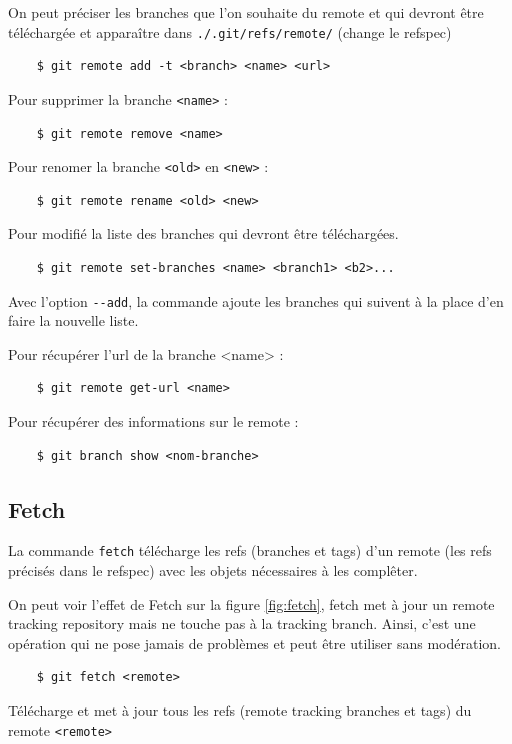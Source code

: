 \documentclass[a4paper, 12pt]{article}
\begin{document}
    On peut préciser les branches que l'on souhaite du remote et qui devront
    être téléchargée et apparaître dans \lstinline{./.git/refs/remote/} (change
    le refspec) 
    \begin{lstlisting}
    $ git remote add -t <branch> <name> <url>
    \end{lstlisting}

    Pour supprimer la branche \lstinline{<name>} :
    \begin{lstlisting}
    $ git remote remove <name>
    \end{lstlisting}

    Pour renomer la branche \lstinline{<old>} en \lstinline{<new>} :
    \begin{lstlisting}
    $ git remote rename <old> <new>
    \end{lstlisting}

    Pour modifié la liste des branches qui devront être téléchargées.
    \begin{lstlisting}
    $ git remote set-branches <name> <branch1> <b2>...
    \end{lstlisting}
    Avec l'option \lstinline{--add}, la commande ajoute les branches qui suivent
    à la place d'en faire la nouvelle liste.

    Pour récupérer l'url de la branche <name> :
    \begin{lstlisting}
    $ git remote get-url <name>
    \end{lstlisting}

    Pour récupérer des informations sur le remote : 
    \begin{lstlisting}
    $ git branch show <nom-branche>
    \end{lstlisting}
    

    \subsection{Fetch}
    La commande \lstinline{fetch} télécharge les refs (branches et tags) d'un
    remote (les refs précisés dans le refspec) avec les objets nécessaires à
    les complêter.

    On peut voir l'effet de Fetch sur la figure \ref{fig:fetch}, fetch met
    à jour un remote tracking repository mais ne touche pas à la tracking
    branch. Ainsi, c'est une opération qui ne pose jamais de problèmes et peut
    être utiliser sans modération.

    \begin{lstlisting}
    $ git fetch <remote>
    \end{lstlisting}
    Télécharge et met à jour tous les refs (remote tracking branches et tags) du
    remote \lstinline{<remote>}
\end{document}
